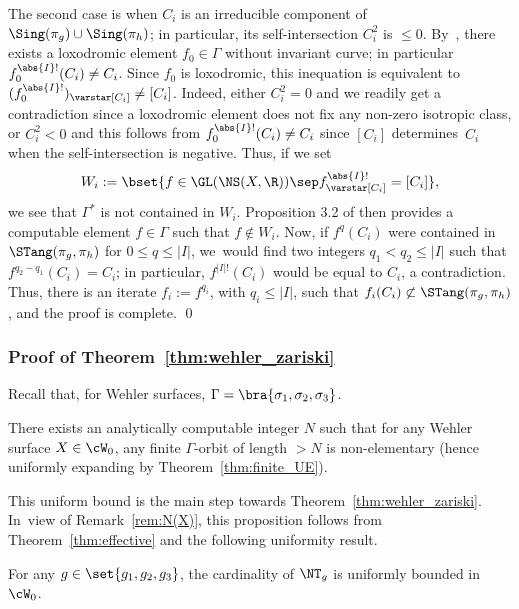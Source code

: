 The second case is when $C_i$ is an irreducible component of $\Sing(\pi_g)\cup\Sing(\pi_h)$;
in particular, its self-intersection $C_i^2$ is $\leq 0$.
By~\cite[Th.\,D]{finite_orbits}, there exists a loxodromic element $f_0\in \Gamma$
without invariant curve; in particular $f_0^{\abs{I}!}(C_i) \neq C_i$. Since $f_0$ is loxodromic, this inequation is equivalent to
$(f_0^{\abs{I}!})_\varstar [C_i] \neq [C_i]$. Indeed, either $C_i^2=0$ and we readily get a contradiction
since a loxodromic element does not fix any non-zero isotropic class, or $C_i^2<0$
and this follows from $f_0^{\abs{I}!}(C_i) \neq C_i$ since
$[C_i]$ determines~$C_i$ when the self-intersection is negative.
Thus, if we set
\begin{equation*}
W_i:=\bset{f\in \GL(\NS(X, \R))\sep f^{\abs{I}!}_\varstar [C_i] = [C_i]},
\end{equation*}
we see that $\Gamma^*$ is not contained in $W_i$. Proposition 3.2 of \cite{eskin-mozes-oh} then provides a computable element $f\in \Gamma$
such that $f\notin W_i$. Now, if $f^q(C_i)$ were contained in $\STang(\pi_g, \pi_h)$ for $0\leq q\leq \vert I\vert$, we~would find two integers $q_1< q_2\leq \vert I\vert$ such that $f^{q_2-q_1}(C_i)=C_i$; in particular, $f^{\vert I\vert !}(C_i)$ would be equal to $C_i$, a contradiction. Thus, there is an iterate $f_i:=f^{q_i}$, with $q_i \leq \vert I\vert$, such that $f_i(C_i)\not \subset \STang(\pi_g, \pi_h)$, and the proof is complete.
\qed

\subsubsection{Proof of Theorem~\ref{thm:wehler_zariski} }\label{par:proof_of_9.3}
Recall that, for Wehler surfaces, $\Gamma = \bra{\sigma_1, \sigma_2, \sigma_3}$.

\begin{pro}\label{pro:N(X)_bounded}
There exists an analytically computable integer $N$ such that for
any Wehler surface $X\in { \cW}_0$, any
finite $\Gamma$-orbit of length $>N$ is non-elementary (hence uniformly expanding by Theorem~\ref{thm:finite_UE}).
\end{pro}

This uniform bound is the main step towards Theorem~\ref{thm:wehler_zariski}. In~view of Remark~\ref{rem:N(X)}, this proposition
follows from Theorem~\ref{thm:effective} and the following uniformity result.

\begin{pro}\label{pro:NT_bounded}
For any $g\in \set{g_1, g_2, g_3}$, the cardinality of $\NT_g$ is uniformly bounded
in $\cW_0$.
\end{pro}

